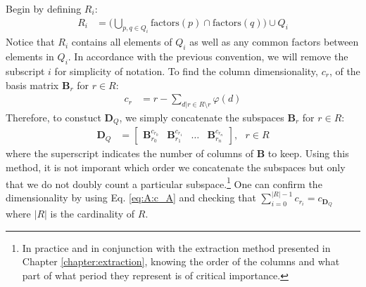         Begin by defining $R_i$:
        \begin{align}\label{eq:A:commonFactors:R}
            R_i &= \Bigg( \bigcup_{p, q \in Q_i} \text{factors}(p) \cap \text{factors}(q) \Bigg) \cup Q_i
        \end{align}
        Notice that $R_i$ contains all elements of $Q_i$ as well as any common factors between elements in $Q_i$. In accordance with the previous convention, we will remove the subscript $i$ for simplicity of notation. To find the column dimensionality, $c_{r}$, of the basis matrix $\bm{B}_r$ for $r \in R$:
        \begin{align}\label{eq:A:commonFactors:cp}
            c_{r} &= r - \sum_{d|r \in R \setminus r} \varphi(d)
        \end{align}
        Therefore, to constuct $\bm{D}_Q$, we simply concatenate the subspaces $\bm{B}_r$ for $r \in R$:
        \begin{align}\label{eq:A:commonFactors:A}
            \bm{D}_Q &= \begin{bmatrix}
                    \bm{B}_{r_0}^{c_{r_0}} &
                    \bm{B}_{r_1}^{c_{r_1}} &
                    \hdots &
                    \bm{B}_{r_n}^{c_{r_n}}
                \end{bmatrix}
                , \text{ } r \in R
        \end{align}
        where the superscript indicates the number of columns of $\bm{B}$ to keep. Using this method, it is not imporant which order we concatenate the subspaces but only that we do not doubly count a particular subspace.\footnote{In practice and in conjunction with the extraction method presented in Chapter \ref{chapter:extraction}, knowing the order of the columns and what part of what period they represent is of critical importance.} One can confirm the dimensionality by using Eq. \eqref{eq:A:c_A} and checking that $\sum_{i = 0}^{|R| - 1} c_{r_i} = c_{\bm{D}_Q}$ where $|R|$ is the cardinality of $R$.

